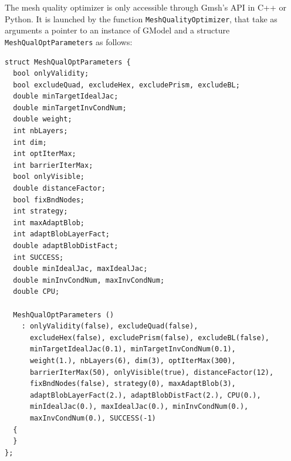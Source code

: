 \documentclass[12pt,a4paper,a4wide]{article}
\begin{document}
The mesh quality optimizer is only accessible through Gmsh's API
in C++ or Python. It is launched by the function
\texttt{MeshQualityOptimizer}, that take as arguments a pointer to
an instance of GModel and a structure \texttt{MeshQualOptParameters}
as follows:
\begin{verbatim}
struct MeshQualOptParameters {
  bool onlyValidity;
  bool excludeQuad, excludeHex, excludePrism, excludeBL;
  double minTargetIdealJac;
  double minTargetInvCondNum;
  double weight;
  int nbLayers;
  int dim;
  int optIterMax;
  int barrierIterMax;
  bool onlyVisible;
  double distanceFactor;
  bool fixBndNodes;
  int strategy;
  int maxAdaptBlob;
  int adaptBlobLayerFact;
  double adaptBlobDistFact;
  int SUCCESS;
  double minIdealJac, maxIdealJac;
  double minInvCondNum, maxInvCondNum;
  double CPU;

  MeshQualOptParameters ()
    : onlyValidity(false), excludeQuad(false),
      excludeHex(false), excludePrism(false), excludeBL(false),
      minTargetIdealJac(0.1), minTargetInvCondNum(0.1),
      weight(1.), nbLayers(6), dim(3), optIterMax(300),
      barrierIterMax(50), onlyVisible(true), distanceFactor(12),
      fixBndNodes(false), strategy(0), maxAdaptBlob(3),
      adaptBlobLayerFact(2.), adaptBlobDistFact(2.), CPU(0.),
      minIdealJac(0.), maxIdealJac(0.), minInvCondNum(0.),
      maxInvCondNum(0.), SUCCESS(-1)
  {
  }
};
\end{verbatim}
\end{document}
